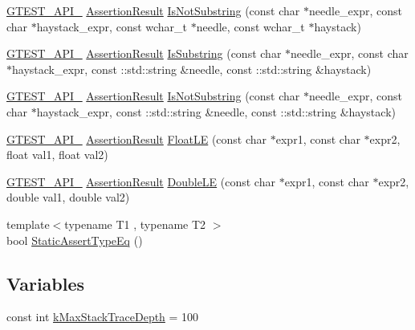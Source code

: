 \begin{DoxyCompactItemize}
\mbox{\hyperlink{gtest-port_8h_aa73be6f0ba4a7456180a94904ce17790}{G\+T\+E\+S\+T\+\_\+\+A\+P\+I\+\_\+}} \mbox{\hyperlink{classtesting_1_1_assertion_result}{Assertion\+Result}} \mbox{\hyperlink{namespacetesting_a28868925c50d541c8568a540b6457e54}{Is\+Not\+Substring}} (const char $\ast$needle\+\_\+expr, const char $\ast$haystack\+\_\+expr, const wchar\+\_\+t $\ast$needle, const wchar\+\_\+t $\ast$haystack)
\item 
\mbox{\hyperlink{gtest-port_8h_aa73be6f0ba4a7456180a94904ce17790}{G\+T\+E\+S\+T\+\_\+\+A\+P\+I\+\_\+}} \mbox{\hyperlink{classtesting_1_1_assertion_result}{Assertion\+Result}} \mbox{\hyperlink{namespacetesting_a32718fab95b2833ab5ffc9cfc9f5c8b0}{Is\+Substring}} (const char $\ast$needle\+\_\+expr, const char $\ast$haystack\+\_\+expr, const \+::std\+::string \&needle, const \+::std\+::string \&haystack)
\item 
\mbox{\hyperlink{gtest-port_8h_aa73be6f0ba4a7456180a94904ce17790}{G\+T\+E\+S\+T\+\_\+\+A\+P\+I\+\_\+}} \mbox{\hyperlink{classtesting_1_1_assertion_result}{Assertion\+Result}} \mbox{\hyperlink{namespacetesting_a645d822e47dc64b9923e78c880807f12}{Is\+Not\+Substring}} (const char $\ast$needle\+\_\+expr, const char $\ast$haystack\+\_\+expr, const \+::std\+::string \&needle, const \+::std\+::string \&haystack)
\item 
\mbox{\hyperlink{gtest-port_8h_aa73be6f0ba4a7456180a94904ce17790}{G\+T\+E\+S\+T\+\_\+\+A\+P\+I\+\_\+}} \mbox{\hyperlink{classtesting_1_1_assertion_result}{Assertion\+Result}} \mbox{\hyperlink{namespacetesting_a69106491c2e7f50e50da0ce5e8ae4374}{Float\+LE}} (const char $\ast$expr1, const char $\ast$expr2, float val1, float val2)
\item 
\mbox{\hyperlink{gtest-port_8h_aa73be6f0ba4a7456180a94904ce17790}{G\+T\+E\+S\+T\+\_\+\+A\+P\+I\+\_\+}} \mbox{\hyperlink{classtesting_1_1_assertion_result}{Assertion\+Result}} \mbox{\hyperlink{namespacetesting_a84c020b981d0eb4eabfb0feda155aaaf}{Double\+LE}} (const char $\ast$expr1, const char $\ast$expr2, double val1, double val2)
\item 
{\footnotesize template$<$typename T1 , typename T2 $>$ }\\bool \mbox{\hyperlink{namespacetesting_a661e70fc6afeb5c085eed3716aa45059}{Static\+Assert\+Type\+Eq}} ()
\end{DoxyCompactItemize}
\subsection*{Variables}
\begin{DoxyCompactItemize}
\item 
const int \mbox{\hyperlink{namespacetesting_ae605f2ccac04616bb7812ca72e517082}{k\+Max\+Stack\+Trace\+Depth}} = 100
\end{DoxyCompactItemize}


